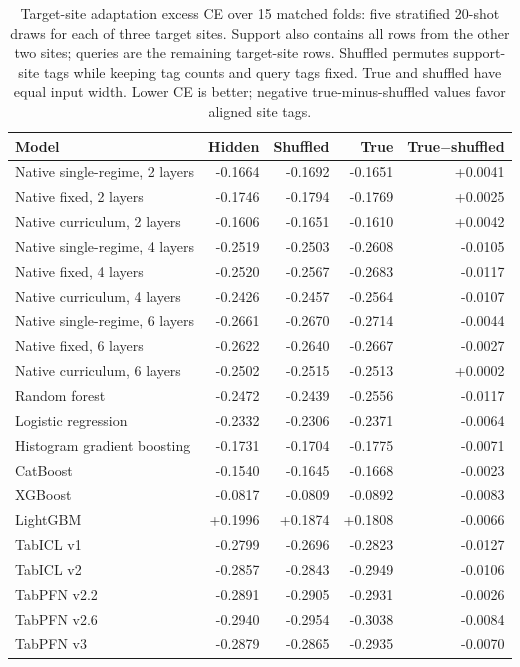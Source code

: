 \begin{table}[htbp]\centering\small
\caption{Target-site adaptation excess CE over 15 matched folds: five stratified 20-shot draws for each of three target sites. Support also contains all rows from the other two sites; queries are the remaining target-site rows. Shuffled permutes support-site tags while keeping tag counts and query tags fixed. True and shuffled have equal input width. Lower CE is better; negative true-minus-shuffled values favor aligned site tags.}\label{tab:heart_adapt}
\begin{tabular}{@{}lrrrr@{}}\toprule
Model & Hidden & Shuffled & True & True$-$shuffled\\\midrule
Native single-regime, 2 layers & -0.1664 & -0.1692 & -0.1651 & +0.0041\\
Native fixed, 2 layers & -0.1746 & -0.1794 & -0.1769 & +0.0025\\
Native curriculum, 2 layers & -0.1606 & -0.1651 & -0.1610 & +0.0042\\
Native single-regime, 4 layers & -0.2519 & -0.2503 & -0.2608 & -0.0105\\
Native fixed, 4 layers & -0.2520 & -0.2567 & -0.2683 & -0.0117\\
Native curriculum, 4 layers & -0.2426 & -0.2457 & -0.2564 & -0.0107\\
Native single-regime, 6 layers & -0.2661 & -0.2670 & -0.2714 & -0.0044\\
Native fixed, 6 layers & -0.2622 & -0.2640 & -0.2667 & -0.0027\\
Native curriculum, 6 layers & -0.2502 & -0.2515 & -0.2513 & +0.0002\\
Random forest & -0.2472 & -0.2439 & -0.2556 & -0.0117\\
Logistic regression & -0.2332 & -0.2306 & -0.2371 & -0.0064\\
Histogram gradient boosting & -0.1731 & -0.1704 & -0.1775 & -0.0071\\
CatBoost & -0.1540 & -0.1645 & -0.1668 & -0.0023\\
XGBoost & -0.0817 & -0.0809 & -0.0892 & -0.0083\\
LightGBM & +0.1996 & +0.1874 & +0.1808 & -0.0066\\
TabICL v1 & -0.2799 & -0.2696 & -0.2823 & -0.0127\\
TabICL v2 & -0.2857 & -0.2843 & -0.2949 & -0.0106\\
TabPFN v2.2 & -0.2891 & -0.2905 & -0.2931 & -0.0026\\
TabPFN v2.6 & -0.2940 & -0.2954 & -0.3038 & -0.0084\\
TabPFN v3 & -0.2879 & -0.2865 & -0.2935 & -0.0070\\
\bottomrule\end{tabular}\end{table}
